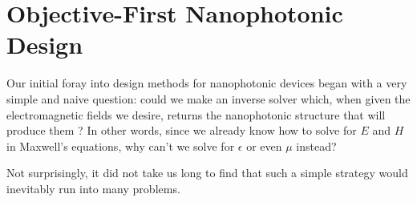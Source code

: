 \newcommand{\BE}{\begin{equation}}
\newcommand{\EE}{\end{equation}}
\newcommand{\BA}{\begin{eqnarray}}
\newcommand{\EA}{\end{eqnarray}}
\newcommand{\curl}{\nabla\times}
\newcommand{\minimize}[1]{\JLUminimize_{#1}\;&}
\newcommand{\subto}{\text{subject to}\;&}

\newcommand{\myfig}[2]{\begin{figure}[!h]\texttt{[image: fig/\#1]}\caption{#2}\label{fig:#1}\end{figure}}

\newcommand{\BI}{\begin{itemize}\item}
\renewcommand{\I}{\item}
\newcommand{\EI}{\end{itemize}}

\newcommand{\ER}[1]{\eqref{eq:#1}}
\newcommand{\SR}[1]{Section~\ref{sec:#1}}
\newcommand{\sR}[1]{section~\ref{sec:#1}}
\newcommand{\FR}[1]{Figure~\ref{fig:#1}}
\newcommand{\fR}[1]{figure~\ref{fig:#1}}
\chapter{Objective-First Nanophotonic Design}
\label{intro}

    

Our initial foray into design methods for nanophotonic devices
    began with a very simple and naive question: 
    could we make an inverse solver which,
    when given the electromagnetic fields we desire,
    returns the nanophotonic structure that will produce them \cite{opex3}?
In other words, since we already know how to solve for $E$ and $H$ 
    in Maxwell's equations, why can't we solve for $\epsilon$
    or even $\mu$ instead?

Not surprisingly, it did not take us long to find that such
    a simple strategy would inevitably run into many problems.


